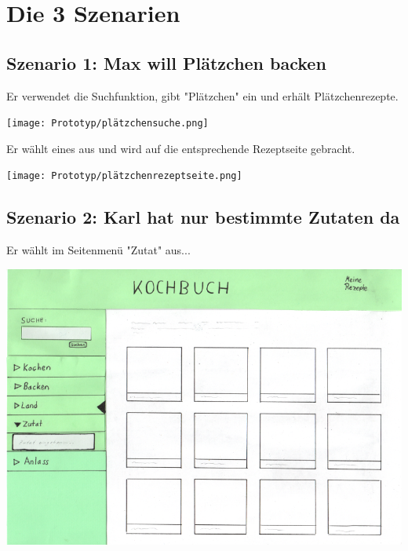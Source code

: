 \documentclass[parskip,10pt,abstracton]{scrartcl}
\begin{document}
\pagebreak
\section*{Die 3 Szenarien}

\subsection*{Szenario 1: Max will Plätzchen backen}

Er verwendet die Suchfunktion, gibt "Plätzchen" ein und erhält Plätzchenrezepte.
\begin{center}
\texttt{[image: Prototyp/plätzchensuche.png]}
\end{center}

Er wählt eines aus und wird auf die entsprechende Rezeptseite gebracht.
\begin{center}
\texttt{[image: Prototyp/plätzchenrezeptseite.png]}
\end{center}


\subsection*{Szenario 2: Karl hat nur bestimmte Zutaten da}

Er wählt im Seitenmenü "Zutat" aus...
\begin{center}
\includegraphics[scale=0.4]{Prototyp/menu_zutat.png}
\end{center}
\end{document}

